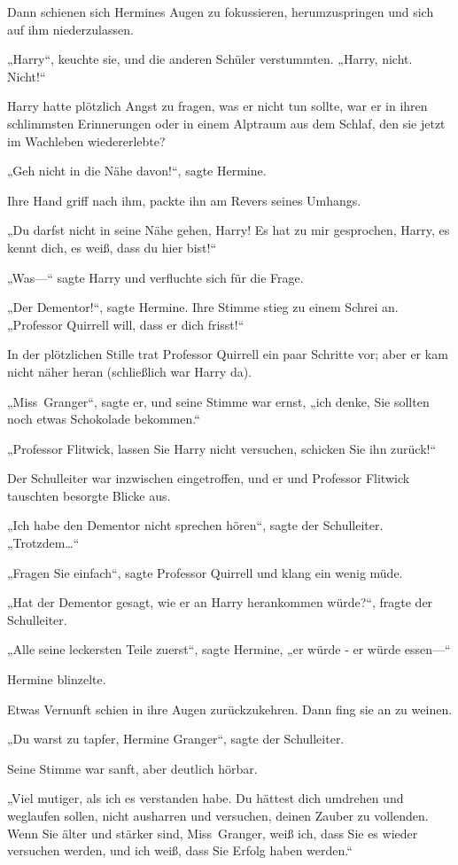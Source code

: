 {Dann schienen sich Hermines Augen zu fokussieren, herumzuspringen und sich auf ihm niederzulassen.

„Harry“, keuchte sie, und die anderen Schüler verstummten. „Harry, nicht. Nicht!“

Harry hatte plötzlich Angst zu fragen, was er nicht tun sollte, war er in ihren schlimmsten Erinnerungen oder in einem Alptraum aus dem Schlaf, den sie jetzt im Wachleben wiedererlebte?

„Geh nicht in die Nähe davon!“, sagte Hermine.

Ihre Hand griff nach ihm, packte ihn am Revers seines Umhangs.

„Du darfst nicht in seine Nähe gehen, Harry! Es hat zu mir gesprochen, Harry, es kennt dich, es weiß, dass du hier bist!“

„Was—“ sagte Harry und verfluchte sich für die Frage.

„Der Dementor!“, sagte Hermine. Ihre Stimme stieg zu einem Schrei an. „Professor Quirrell will, dass er dich frisst!“

In der plötzlichen Stille trat Professor Quirrell ein paar Schritte vor; aber er kam nicht näher heran (schließlich war Harry da).

„Miss~Granger“, sagte er, und seine Stimme war ernst, „ich denke, Sie sollten noch etwas Schokolade bekommen.“

„Professor Flitwick, lassen Sie Harry nicht versuchen, schicken Sie ihn zurück!“

Der Schulleiter war inzwischen eingetroffen, und er und Professor Flitwick tauschten besorgte Blicke aus.

„Ich habe den Dementor nicht sprechen hören“, sagte der Schulleiter. „Trotzdem…“

„Fragen Sie einfach“, sagte Professor Quirrell und klang ein wenig müde.

„Hat der Dementor gesagt, wie er an Harry herankommen würde?“, fragte der Schulleiter.

„Alle seine leckersten Teile zuerst“, sagte Hermine, „er würde - er würde essen—“

Hermine blinzelte.

Etwas Vernunft schien in ihre Augen zurückzukehren. Dann fing sie an zu weinen.

„Du warst zu tapfer, Hermine Granger“, sagte der Schulleiter.

Seine Stimme war sanft, aber deutlich hörbar.

„Viel mutiger, als ich es verstanden habe. Du hättest dich umdrehen und weglaufen sollen, nicht ausharren und versuchen, deinen Zauber zu vollenden. Wenn Sie älter und stärker sind, Miss~Granger, weiß ich, dass Sie es wieder versuchen werden, und ich weiß, dass Sie Erfolg haben werden.“

}
